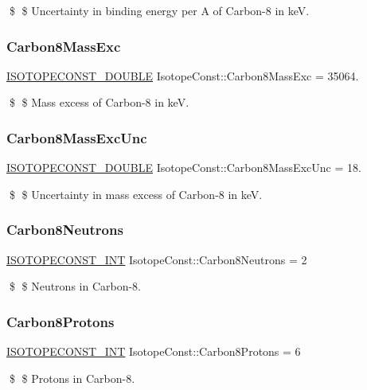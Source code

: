\$ \$ Uncertainty in binding energy per A of Carbon-\/8 in keV. \mbox{\label{group___isotope_const-_carbon-_c8_gad310351b0b0b73ad200189de809a8deb}} 
\subsubsection{\texorpdfstring{Carbon8\+Mass\+Exc}{Carbon8MassExc}}
{\footnotesize\ttfamily \mbox{\hyperlink{group___isotope_const-_macros_ga8f45a7272ce02c0b4c65c44636ed719a}{I\+S\+O\+T\+O\+P\+E\+C\+O\+N\+S\+T\+\_\+\+D\+O\+U\+B\+LE}} Isotope\+Const\+::\+Carbon8\+Mass\+Exc = 35064.}

\$ \$ Mass excess of Carbon-\/8 in keV. \mbox{\label{group___isotope_const-_carbon-_c8_ga2564393be877ca51e1e463ca4dce59cd}} 
\subsubsection{\texorpdfstring{Carbon8\+Mass\+Exc\+Unc}{Carbon8MassExcUnc}}
{\footnotesize\ttfamily \mbox{\hyperlink{group___isotope_const-_macros_ga8f45a7272ce02c0b4c65c44636ed719a}{I\+S\+O\+T\+O\+P\+E\+C\+O\+N\+S\+T\+\_\+\+D\+O\+U\+B\+LE}} Isotope\+Const\+::\+Carbon8\+Mass\+Exc\+Unc = 18.}

\$ \$ Uncertainty in mass excess of Carbon-\/8 in keV. \mbox{\label{group___isotope_const-_carbon-_c8_ga73bd0753f3cd08052ae1d2f57ef01285}} 
\subsubsection{\texorpdfstring{Carbon8\+Neutrons}{Carbon8Neutrons}}
{\footnotesize\ttfamily \mbox{\hyperlink{group___isotope_const-_macros_ga5f18360b3e99483a35c32d789e62621c}{I\+S\+O\+T\+O\+P\+E\+C\+O\+N\+S\+T\+\_\+\+I\+NT}} Isotope\+Const\+::\+Carbon8\+Neutrons = 2}

\$ \$ Neutrons in Carbon-\/8. \mbox{\label{group___isotope_const-_carbon-_c8_ga937b306870a07c9b8ecfe538c85a3328}} 
\subsubsection{\texorpdfstring{Carbon8\+Protons}{Carbon8Protons}}
{\footnotesize\ttfamily \mbox{\hyperlink{group___isotope_const-_macros_ga5f18360b3e99483a35c32d789e62621c}{I\+S\+O\+T\+O\+P\+E\+C\+O\+N\+S\+T\+\_\+\+I\+NT}} Isotope\+Const\+::\+Carbon8\+Protons = 6}

\$ \$ Protons in Carbon-\/8. 